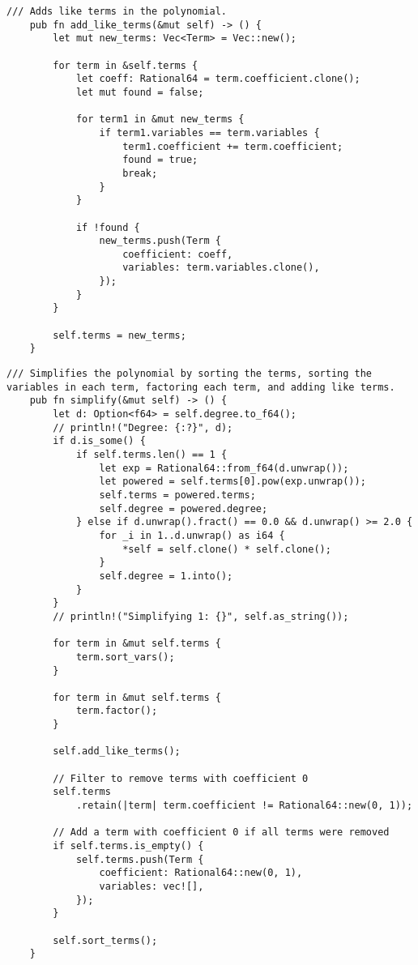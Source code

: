 \begin{lstlisting}[caption={The implementation of the \texttt{add\_like\_terms()} method for the \texttt{Polynomial} struct}, label={lst:polynomial-add-like-terms}]
    /// Adds like terms in the polynomial.
    pub fn add_like_terms(&mut self) -> () {
        let mut new_terms: Vec<Term> = Vec::new();

        for term in &self.terms {
            let coeff: Rational64 = term.coefficient.clone();
            let mut found = false;

            for term1 in &mut new_terms {
                if term1.variables == term.variables {
                    term1.coefficient += term.coefficient;
                    found = true;
                    break;
                }
            }

            if !found {
                new_terms.push(Term {
                    coefficient: coeff,
                    variables: term.variables.clone(),
                });
            }
        }

        self.terms = new_terms;
    }
\end{lstlisting}

\begin{lstlisting}[caption={The implementation of the \texttt{simplify()} method for the \texttt{Polynomial} struct}, label={lst:polynomial-simplify}]
    /// Simplifies the polynomial by sorting the terms, sorting the variables in each term, factoring each term, and adding like terms.
    pub fn simplify(&mut self) -> () {
        let d: Option<f64> = self.degree.to_f64();
        // println!("Degree: {:?}", d);
        if d.is_some() {
            if self.terms.len() == 1 {
                let exp = Rational64::from_f64(d.unwrap());
                let powered = self.terms[0].pow(exp.unwrap());
                self.terms = powered.terms;
                self.degree = powered.degree;
            } else if d.unwrap().fract() == 0.0 && d.unwrap() >= 2.0 {
                for _i in 1..d.unwrap() as i64 {
                    *self = self.clone() * self.clone();
                }
                self.degree = 1.into();
            }
        }
        // println!("Simplifying 1: {}", self.as_string());

        for term in &mut self.terms {
            term.sort_vars();
        }

        for term in &mut self.terms {
            term.factor();
        }

        self.add_like_terms();

        // Filter to remove terms with coefficient 0
        self.terms
            .retain(|term| term.coefficient != Rational64::new(0, 1));

        // Add a term with coefficient 0 if all terms were removed
        if self.terms.is_empty() {
            self.terms.push(Term {
                coefficient: Rational64::new(0, 1),
                variables: vec![],
            });
        }

        self.sort_terms();
    }
\end{lstlisting}

